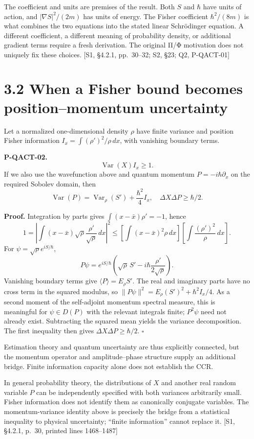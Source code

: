 \documentclass[
  11pt,
  oneside]{book}
\begin{document}
The coefficient and units are premises of the result. Both \(S\) and
\(\hbar\) have units of action, and \(|\nabla S|^2/(2m)\) has units of
energy. The Fisher coefficient \(\hbar^2/(8m)\) is what combines the two
equations into the stated linear Schrödinger equation. A different
coefficient, a different meaning of probability density, or additional
gradient terms require a fresh derivation. The original Π/Φ motivation
does not uniquely fix these choices. {[}S1, §4.2.1, pp.~30--32; S2, §23;
Q2, P-QACT-01{]}

\section{3.2 When a Fisher bound becomes position--momentum uncertainty}

Let a normalized one-dimensional density \(\rho\) have finite variance
and position Fisher information \(I_x=\int(\rho')^2/\rho\,dx\), with
vanishing boundary terms.

\label{p-qact-02}{}

\textbf{P-QACT-02.} \[
\operatorname{Var}(X)I_x\ge1.
\] If we also use the wavefunction above and quantum momentum
\(P=-i\hbar\partial_x\) on the required Sobolev domain, then \[
\operatorname{Var}(P)=\operatorname{Var}_\rho(S')
+\frac{\hbar^2}{4}I_x,
\quad \Delta X\Delta P\ge\hbar/2.
\]

\textbf{Proof.} Integration by parts gives \(\int(x-\bar x)\rho'=-1\),
hence \[
1=\left|\int(x-\bar x)\sqrt\rho\frac{\rho'}{\sqrt\rho}\,dx\right|^2
\le\left[\int(x-\bar x)^2\rho\,dx\right]
\left[\int\frac{(\rho')^2}{\rho}\,dx\right].
\] For \(\psi=\sqrt\rho e^{iS/\hbar}\), \[
P\psi=e^{iS/\hbar}\left(\sqrt\rho\,S'-i\hbar\frac{\rho'}{2\sqrt\rho}\right).
\] Vanishing boundary terms give \(\langle P\rangle=E_\rho S'\). The
real and imaginary parts have no cross term in the squared modulus, so
\(\|P\psi\|^2=E_\rho(S')^2+\hbar^2I_x/4\). As a second moment of the
self-adjoint momentum spectral measure, this is meaningful for
\(\psi\in D(P)\) with the relevant integrals finite; \(P^2\psi\) need
not already exist. Subtracting the squared mean yields the variance
decomposition. The first inequality then gives
\(\Delta X\Delta P\ge\hbar/2\). \(\square\)

Estimation theory and quantum uncertainty are thus explicitly connected,
but the momentum operator and amplitude--phase structure supply an
additional bridge. Finite information capacity alone does not establish
the CCR.

In general probability theory, the distributions of \(X\) and another
real random variable \(P\) can be independently specified with both
variances arbitrarily small. Fisher information does not identify them
as canonically conjugate variables. The momentum-variance identity above
is precisely the bridge from a statistical inequality to physical
uncertainty; ``finite information'' cannot replace it. {[}S1, §4.2.1,
p.~30, printed lines 1468--1487{]}
\end{document}
